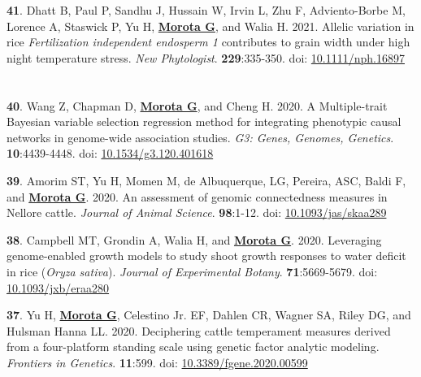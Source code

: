 \documentclass[margin,line,10pt]{res}
\newenvironment{list1}{
  \begin{list}{\ding{113}}{%
      \setlength{\itemsep}{0in}
      \setlength{\parsep}{0in} \setlength{\parskip}{0in}
      \setlength{\topsep}{0in} \setlength{\partopsep}{0in} 
      \setlength{\leftmargin}{0.17in}}}{\end{list}}
\begin{document}
\begin{resume}
\begin{list1}
  \item [{\bf 41}.] Dhatt B, Paul P, Sandhu J, Hussain W, Irvin L, Zhu F, Adviento-Borbe M, Lorence A, Staswick P, Yu H, \textbf{\underline{Morota G}}, and Walia H. 2021. Allelic variation in rice \textit{Fertilization independent endosperm 1} contributes to grain width under high night temperature stress. \emph{New Phytologist}. \textbf{229}:335-350. doi: \textcolor{blue}{\href{https://doi.org/10.1111/nph.16897}{10.1111/nph.16897}}

  
\end{list1}


\section{}
\begin{list1}

  \item [{\bf 40}.] Wang Z, Chapman D, \textbf{\underline{Morota G}}, and Cheng H. 2020. A Multiple-trait Bayesian variable selection regression method for integrating phenotypic causal networks in genome-wide association studies. \emph{G3: Genes, Genomes, Genetics}. \textbf{10}:4439-4448. doi: \textcolor{blue}{\href{https://doi.org/10.1534/g3.120.401618}{10.1534/g3.120.401618}}

  \vspace{0.5cm}

\item [{\bf 39}.] Amorim ST, Yu H, Momen M, de Albuquerque, LG, Pereira, ASC, Baldi F, and \textbf{\underline{Morota G}}. 2020. An assessment of genomic connectedness measures in Nellore cattle. \emph{Journal of Animal Science}.  \textbf{98}:1-12.  doi: \textcolor{blue}{\href{https://doi.org/10.1093/jas/skaa289}{10.1093/jas/skaa289}} 

  \vspace{0.5cm}

\item  [{\bf 38}.]  Campbell MT, Grondin A, Walia H, and \textbf{\underline{Morota G}}. 2020. Leveraging genome-enabled growth models to study shoot growth responses to water deficit in rice ({\it Oryza sativa}). \emph{Journal of Experimental Botany}. \textbf{71}:5669-5679. doi: \textcolor{blue}{\href{https://doi.org/10.1093/jxb/eraa280}{10.1093/jxb/eraa280}}

    \vspace{0.5cm}
    
\item [{\bf 37}.] Yu H, \textbf{\underline{Morota G}}, Celestino Jr. EF, Dahlen CR, Wagner SA, Riley DG, and Hulsman Hanna LL. 2020. Deciphering cattle temperament measures derived from a four-platform standing scale using genetic factor analytic modeling. \emph{Frontiers in Genetics}. \textbf{11}:599. doi: \textcolor{blue}{\href{https://doi.org/10.3389/fgene.2020.00599}{10.3389/fgene.2020.00599}}


\end{list1}
\end{resume}
\end{document}
